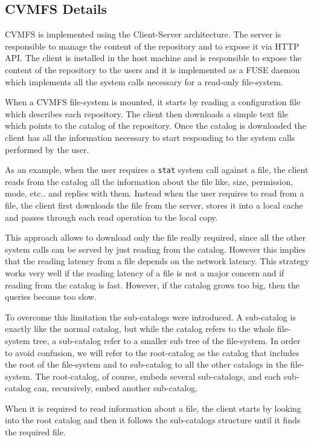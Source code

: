\subsection{CVMFS Details}\label{subsec:cvmfs-details}

CVMFS is implemented using the Client-Server architecture. The server is
responsible to manage the content of the repository and to expose it via HTTP
API.  The client is installed in the host machine and is responsible to expose
the content of the repository to the users and it is implemented as a FUSE
daemon which implements all the system calls necessary for a read-only
file-system.

When a CVMFS file-system is mounted, it starts by reading a configuration file
which describes each repository. The client then downloads a simple text file
which points to the catalog of the repository. Once the catalog is downloaded
the client has all the information necessary to start responding to the system
calls performed by the user.

As an example, when the user requires a \texttt{stat} system call against a
file, the client reads from the catalog all the information about the file
like, size, permission, mode, etc.. and replies with them. Instead when the
user requires to read from a file, the client first downloads the file from the
server, stores it into a local cache and passes through each read operation to
the local copy.

This approach allows to download only the file really required, since all the
other system calls can be served by just reading from the catalog. However this
implies that the reading latency from a file depends on the network latency.
This strategy works very well if the reading latency of a file is not a major
concern and if reading from the catalog is fast. However, if the catalog grows
too big, then the queries become too slow. 

To overcome this limitation the sub-catalogs were introduced.  A sub-catalog is
exactly like the normal catalog, but while the catalog refers to the whole
file-system tree, a sub-catalog refer to a smaller sub tree of the file-system.
In order to avoid confusion, we will refer to the root-catalog as the catalog
that includes the root of the file-system and to sub-catalog to all the other
catalogs in the file-system. The root-catalog, of course, embeds several
sub-catalogs, and each sub-catalog can, recursively, embed another sub-catalog.

When it is required to read information about a file, the client starts by
looking into the root catalog and then it follows the sub-catalogs structure
until it finds the required file.

